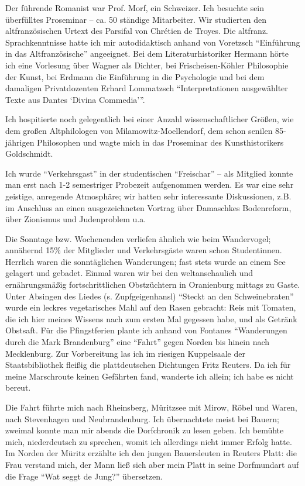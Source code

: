 Der führende Romanist war Prof. Morf, ein Schweizer. Ich besuchte sein überfülltes Proseminar -- ca. 50 ständige Mitarbeiter. Wir studierten den altfranzösischen Urtext des Parsifal von Chrétien de Troyes. Die altfranz. Sprachkenntnisse hatte ich mir autodidaktisch anhand von Voretzsch \enquote{Einführung in das Altfranzösische} angeeignet. Bei dem Literaturhistoriker Hermann hörte ich eine Vorlesung über Wagner als Dichter, bei Frischeisen-Köhler Philosophie der Kunst, bei Erdmann die Einführung in die Psychologie und bei dem damaligen Privatdozenten Erhard Lommatzsch \enquote{Interpretationen ausgewählter Texte aus Dantes \enquote{Divina Commedia}}.

Ich hospitierte noch gelegentlich bei einer Anzahl wissenschaftlicher Größen, wie dem großen Altphilologen von Milamowitz-Moellendorf, dem schon senilen 85-jährigen Philosophen und wagte mich in das Proseminar des Kunsthistorikers Goldschmidt.

Ich wurde \enquote{Verkehrsgast} in der studentischen \enquote{Freischar} -- als Mitglied konnte man erst nach 1-2 semestriger Probezeit aufgenommen werden. Es war eine sehr geistige, anregende Atmosphäre; wir hatten sehr interessante Diskussionen, z.B. im Anschluss an einen ausgezeichneten Vortrag über Damaschkes Bodenreform, über Zionismus und Judenproblem u.a.

Die Sonntage bzw. Wochenenden verliefen ähnlich wie beim Wandervogel; annähernd 15\% der Mitglieder und Verkehrsgäste waren schon Studentinnen. Herrlich waren die sonntäglichen Wanderungen; fast stets wurde an einem See gelagert und gebadet. Einmal waren wir bei den weltanschaulich und ernährungsmäßig fortschrittlichen Obstzüchtern in Oranienburg mittags zu Gaste. Unter Absingen des Liedes (s. Zupfgeigenhansl) \enquote{Steckt an den Schweinebraten} wurde ein leckres vegetarisches Mahl auf den Rasen gebracht: Reis mit Tomaten, die ich hier meines Wissens nach zum ersten Mal gegessen habe, und als Getränk Obstsaft. Für die Pfingstferien plante ich anhand von Fontanes \enquote{Wanderungen durch die Mark Brandenburg} eine \enquote{Fahrt} gegen Norden bis hinein nach Mecklenburg. Zur Vorbereitung las ich im riesigen Kuppelsaale der Staatsbibliothek fleißig die plattdeutschen Dichtungen Fritz Reuters. Da ich für meine Marschroute keinen Gefährten fand, wanderte ich allein; ich habe es nicht bereut.

Die Fahrt führte mich nach Rheinsberg, Müritzsee mit Mirow, Röbel und Waren, nach Stevenhagen und Neubrandenburg. Ich übernachtete meist bei Bauern; zweimal konnte man mir abends die Dorfchronik zu lesen geben.
Ich bemühte mich, niederdeutsch zu sprechen, womit ich allerdings nicht immer Erfolg hatte. Im Norden der Müritz erzählte ich den jungen Bauersleuten in Reuters Platt: die Frau verstand mich, der Mann ließ sich aber mein Platt in seine Dorfmundart auf die Frage \enquote{Wat seggt de Jung?} übersetzen.

